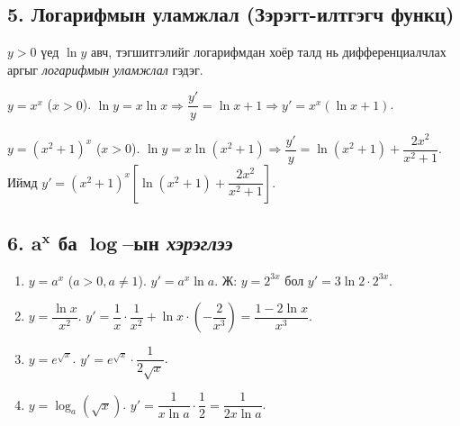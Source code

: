\subsection*{5. Логарифмын уламжлал (Зэрэгт-илтгэгч функц)}
\begin{remark}
$y>0$ үед $\ln y$ авч, тэгшитгэлийг логарифмдан хоёр талд нь дифференциалчлах аргыг \emph{логарифмын уламжлал} гэдэг.
\end{remark}

\begin{example}
$y=x^x$ ($x>0$). $\ln y = x\ln x \Rightarrow \dfrac{y'}{y}=\ln x + 1 \Rightarrow \boxed{y'=x^x(\ln x + 1)}$.
\end{example}

\begin{example}
$y=(x^2+1)^x$ ($x>0$). $\ln y = x\ln(x^2+1)\Rightarrow \dfrac{y'}{y}=\ln(x^2+1)+\dfrac{2x^2}{x^2+1}$.\\
Иймд $\boxed{y'=(x^2+1)^x\!\left[\ln(x^2+1)+\dfrac{2x^2}{x^2+1}\right]}$.
\end{example}

\subsection*{6. $\boldsymbol{a^x}$ ба $\boldsymbol{\log}$–ын \emph{хэрэглээ} }
\begin{example}
\begin{enumerate}
  \item $y=a^x$ ($a>0,a\ne1$). $y'=a^x\ln a$. \;
        Ж: $y=2^{3x}$ бол $y'=3\ln2\cdot 2^{3x}$.
  \item $y=\dfrac{\ln x}{x^2}$.\; $y'=\dfrac{1}{x}\cdot\dfrac{1}{x^2} + \ln x \cdot \left(-\dfrac{2}{x^3}\right)=\dfrac{1-2\ln x}{x^3}$.
  \item $y=e^{\sqrt{x}}$.\; $y'=e^{\sqrt{x}}\cdot\dfrac{1}{2\sqrt{x}}$.
  \item $y=\log_a(\sqrt{x})$.\; $y'=\dfrac{1}{x\ln a}\cdot\dfrac{1}{2}=\dfrac{1}{2x\ln a}$.
\end{enumerate}
\end{example}

